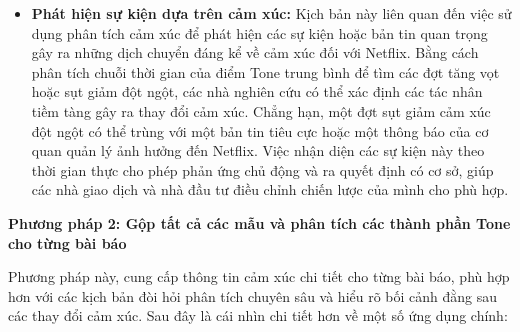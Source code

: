 \begin{itemize}
\item
  \textbf{Phát hiện sự kiện dựa trên cảm xúc:} Kịch bản này liên quan đến việc sử dụng phân tích cảm xúc để phát hiện các sự kiện hoặc bản tin quan trọng gây ra những dịch chuyển đáng kể về cảm xúc đối với Netflix. Bằng cách phân tích chuỗi thời gian của điểm Tone trung bình để tìm các đợt tăng vọt hoặc sụt giảm đột ngột, các nhà nghiên cứu có thể xác định các tác nhân tiềm tàng gây ra thay đổi cảm xúc. Chẳng hạn, một đợt sụt giảm cảm xúc đột ngột có thể trùng với một bản tin tiêu cực hoặc một thông báo của cơ quan quản lý ảnh hưởng đến Netflix. Việc nhận diện các sự kiện này theo thời gian thực cho phép phản ứng chủ động và ra quyết định có cơ sở, giúp các nhà giao dịch và nhà đầu tư điều chỉnh chiến lược của mình cho phù hợp.
\end{itemize}

\textbf{Phương pháp 2: Gộp tất cả các mẫu và phân tích các thành phần Tone cho từng bài báo}

Phương pháp này, cung cấp thông tin cảm xúc chi tiết cho từng bài báo, phù hợp hơn với các kịch bản đòi hỏi phân tích chuyên sâu và hiểu rõ bối cảnh đằng sau các thay đổi cảm xúc. Sau đây là cái nhìn chi tiết hơn về một số ứng dụng chính:


